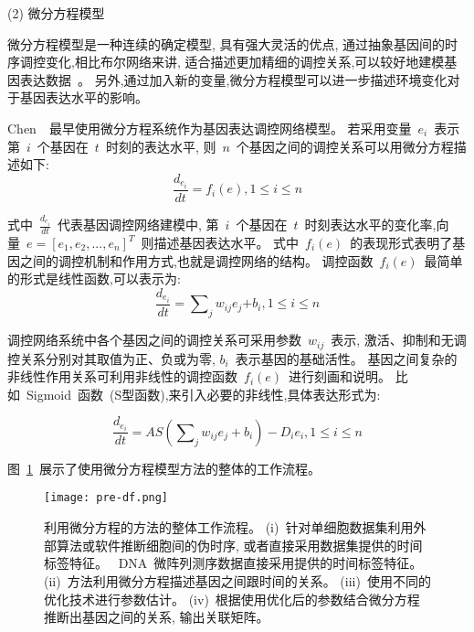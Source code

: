(2) 微分方程模型

微分方程模型是一种连续的确定模型, 具有强大灵活的优点,
通过抽象基因间的时序调控变化,相比布尔网络来讲, 适合描述更加精细的调控关系,可以较好地建模基因表达数据~\cite{gardner2003inferring,di2005chemogenomic,bansal2006inference, honkela2010model,lu2011high,li2011large}。
另外,通过加入新的变量,微分方程模型可以进一步描述环境变化对于基因表达水平的影响。

Chen~\cite{chen1999modeling}~最早使用微分方程系统作为基因表达调控网络模型。
若采用变量~$e_i$~表示第~$i$~个基因在~$t$~时刻的表达水平, 则~$n$~个基因之间的调控关系可以用微分方程描述如下:
\begin{equation}
\frac{{d_{e_i}}}{{dt}} = f_i (e),1 \le i \le n
\end{equation}

式中~$\frac{{d_{e_i }}}{{dt}}$~代表基因调控网络建模中,
第~$i$~个基因在~$t$~时刻表达水平的变化率,向量~$e=[e_1,e_2,...,e_n]^T$~则描述基因表达水平。
式中~$f_i(e)$~的表现形式表明了基因之间的调控机制和作用方式,也就是调控网络的结构。
调控函数~$f_i(e)$~最简单的形式是线性函数,可以表示为:
\begin{equation}
\frac{{d_{e_i }}}{{dt}} = \sum\nolimits_j {w_{ij} e_j} { + b_i } ,1 \le i \le n
\end{equation}

调控网络系统中各个基因之间的调控关系可采用参数~$w_{ij}$~表示,
激活、抑制和无调控关系分别对其取值为正、负或为零, $b_i$~表示基因的基础活性。
基因之间复杂的非线性作用关系可利用非线性的调控函数~$f_i(e)$~进行刻画和说明。
比如~Sigmoid~函数~(S型函数),来引入必要的非线性,具体表达形式为:

\begin{equation}
\frac{{d_{e_i } }}{{dt}} = AS(\sum\nolimits_j {w_{ij} e_j } + b_i) - D_i e_i ,1 \le i \le n
\end{equation}

图~\ref{fig:pre-df}~展示了使用微分方程模型方法的整体的工作流程。
\begin{figure}[!htbp]
    \centering
    \texttt{[image: pre-df.png]}
    \caption{
        利用微分方程的方法的整体工作流程。
        (i)~针对单细胞数据集利用外部算法或软件推断细胞间的伪时序, 或者直接采用数据集提供的时间标签特征。
        ~DNA~微阵列测序数据直接采用提供的时间标签特征。
        (ii)~方法利用微分方程描述基因之间跟时间的关系。
        (iii)~使用不同的优化技术进行参数估计。
        (iv)~根据使用优化后的参数结合微分方程推断出基因之间的关系, 输出关联矩阵。
    }
    \label{fig:pre-df}
\end{figure}

